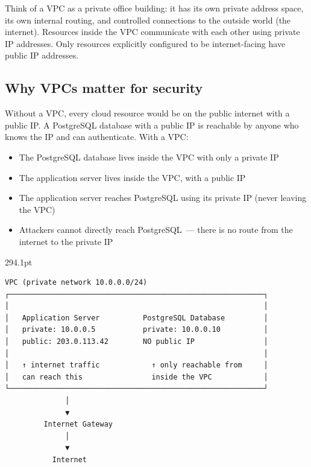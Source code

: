 Think of a VPC as a private office building: it has its own private address space, its own internal routing, and controlled connections to the outside world (the internet). Resources inside the VPC communicate with each other using private IP addresses. Only resources explicitly configured to be internet-facing have public IP addresses.

\subsection*{Why VPCs matter for security}\label{22-network-configuration:why-vpcs-matter-for-security}

Without a VPC, every cloud resource would be on the public internet with a public IP. A PostgreSQL database with a public IP is reachable by anyone who knows the IP and can authenticate. With a VPC:

\begin{itemize}
\tightlist
\item
  The PostgreSQL database lives inside the VPC with only a private IP
\item
  The application server lives inside the VPC, with a public IP
\item
  The application server reaches PostgreSQL using its private IP (never leaving the VPC)
\item
  Attackers cannot directly reach PostgreSQL~--- there is no route from the internet to the private IP
\end{itemize}

\begin{diagrambox}[short]{294.1pt}
\begin{Verbatim}[fontsize=\fontsize{9.0}{8.55}\selectfont]
VPC (private network 10.0.0.0/24)
┌───────────────────────────────────────────────────────────┐
│                                                           │
│   Application Server          PostgreSQL Database         │
│   private: 10.0.0.5           private: 10.0.0.10          │
│   public: 203.0.113.42        NO public IP                │
│                                                           │
│   ↑ internet traffic            ↑ only reachable from     │
│   can reach this                inside the VPC            │
└───────────────────────────────────────────────────────────┘
              │
              ▼
         Internet Gateway
              │
              ▼
           Internet
\end{Verbatim}
\end{diagrambox}

